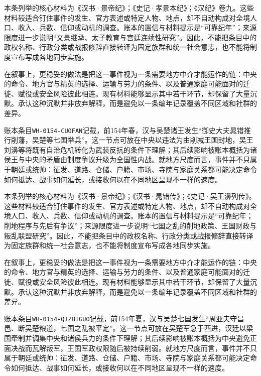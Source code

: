 本条列举的核心材料为《汉书·景帝纪》；《史记·孝景本纪》；《汉纪》卷九。这些材料较适合钉住事件的发生、官方表述或特定人物、地点，却不自动构成对全境人口、收入、兵数、信仰或动机的调查。账本的置信与材料提示是“可靠纪年”；来源限度进一步说明“文景继承、太子教育与宫廷连续性研究”。因此，不能把条目中的政权名称、行政分类或战报修辞直接转译为固定族群和统一社会意志，也不能将制度宣布写成各地同步实施。

在叙事上，更稳妥的做法是把这一事件视为一条需要地方中介才能运作的链：中央的命令、地方官与精英的选择、运输与劳力的条件、以及普通家庭可能面对的迁徙、赋役或安全风险彼此相连。现有材料能够显示其中若干环节，却保留了大量沉默。承认这种沉默并非放弃解释，而是避免以一条编年记录覆盖不同区域和社群的差异。

账本条目\texttt{WH-0154-CUOFAN}记载，前154年春，汉与吴楚诸王发生“御史大夫晁错推行削藩，吴楚等七国举兵”。这一节点可放在中央以违法为由削减王国封地，吴王刘濞等将既有自治危机转化为武装反抗的条件下理解；其后续影响被账本概括为诸侯王与中央的矛盾由制度争议升级为全国性内战。就地方尺度而言，事件并不只属于朝廷或统帅：征发、道路、仓储、户籍、市场、寺院与家庭关系都可能决定命令如何抵达、战事如何延长，或接收何以在不同地区呈现不一样的速度。

本条列举的核心材料为《汉书·景帝纪》；《汉书·晁错传》；《史记·吴王濞列传》。这些材料较适合钉住事件的发生、官方表述或特定人物、地点，却不自动构成对全境人口、收入、兵数、信仰或动机的调查。账本的置信与材料提示是“可靠纪年；削地程序与先后有争议”；来源限度进一步说明“七国之乱的削地政策、王国财政与叛乱联盟研究”。因此，不能把条目中的政权名称、行政分类或战报修辞直接转译为固定族群和统一社会意志，也不能将制度宣布写成各地同步实施。

在叙事上，更稳妥的做法是把这一事件视为一条需要地方中介才能运作的链：中央的命令、地方官与精英的选择、运输与劳力的条件、以及普通家庭可能面对的迁徙、赋役或安全风险彼此相连。现有材料能够显示其中若干环节，却保留了大量沉默。承认这种沉默并非放弃解释，而是避免以一条编年记录覆盖不同区域和社群的差异。

账本条目\texttt{WH-0154-QIZHIGUO}记载，前154年夏，汉与吴楚七国发生“周亚夫守昌邑、断吴楚粮道，七国之乱被平定”。这一节点可放在吴楚军急于西进，汉廷以梁国牵制并调集中央和诸侯兵力的条件下理解；其后续影响被账本概括为中央避免正面决战而瓦解叛军，王国军政权限随后被持续削弱。就地方尺度而言，事件并不只属于朝廷或统帅：征发、道路、仓储、户籍、市场、寺院与家庭关系都可能决定命令如何抵达、战事如何延长，或接收何以在不同地区呈现不一样的速度。

